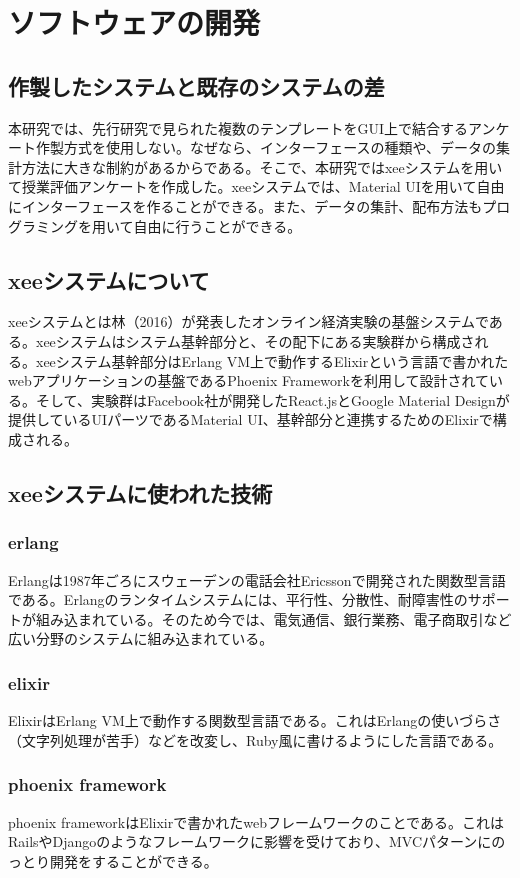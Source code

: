 \documentclass[11pt,a4paper]{jsarticle}
\begin{document}
\section{ソフトウェアの開発}
\subsection{作製したシステムと既存のシステムの差}
本研究では、先行研究で見られた複数のテンプレートをGUI上で結合するアンケート作製方式を使用しない。なぜなら、インターフェースの種類や、データの集計方法に大きな制約があるからである。そこで、本研究ではxeeシステムを用いて授業評価アンケートを作成した。xeeシステムでは、Material UIを用いて自由にインターフェースを作ることができる。また、データの集計、配布方法もプログラミングを用いて自由に行うことができる。
\subsection{xeeシステムについて}
xeeシステムとは林（2016）が発表したオンライン経済実験の基盤システムである。xeeシステムはシステム基幹部分と、その配下にある実験群から構成される。xeeシステム基幹部分はErlang VM上で動作するElixirという言語で書かれたwebアプリケーションの基盤であるPhoenix Frameworkを利用して設計されている。そして、実験群はFacebook社が開発したReact.jsとGoogle Material Designが提供しているUIパーツであるMaterial UI、基幹部分と連携するためのElixirで構成される。
\subsection{xeeシステムに使われた技術}
\subsubsection{erlang}
Erlangは1987年ごろにスウェーデンの電話会社Ericssonで開発された関数型言語である。Erlangのランタイムシステムには、平行性、分散性、耐障害性のサポートが組み込まれている。そのため今では、電気通信、銀行業務、電子商取引など広い分野のシステムに組み込まれている。
\subsubsection{elixir}
ElixirはErlang VM上で動作する関数型言語である。これはErlangの使いづらさ（文字列処理が苦手）などを改変し、Ruby風に書けるようにした言語である。
\subsubsection{phoenix framework}
phoenix frameworkはElixirで書かれたwebフレームワークのことである。これはRailsやDjangoのようなフレームワークに影響を受けており、MVCパターンにのっとり開発をすることができる。
\end{document}
